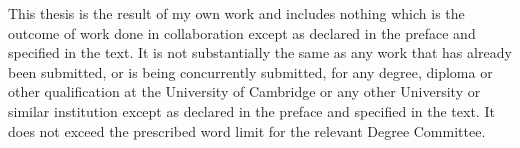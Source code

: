 
\begin{declaration}

This thesis is the result of my own work and includes nothing which is the outcome of work done in collaboration except as declared in the preface and specified in the text. It is not substantially the same as any work that has already been submitted, or is being concurrently submitted, for any degree, diploma or other qualification at the University of Cambridge or any other University or similar institution except as declared in the preface and specified in the text. It does not exceed the prescribed word limit for the relevant Degree Committee. 



\end{declaration}

